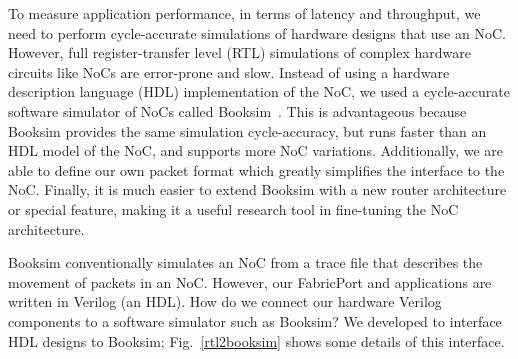

To measure application performance, in terms of latency and throughput, we need to perform cycle-accurate simulations of hardware designs that use an NoC.
However, full register-transfer level (RTL) simulations of complex hardware circuits like NoCs are error-prone and slow.
Instead of using a hardware description language (HDL) implementation of the NoC, we used a cycle-accurate software simulator of NoCs called Booksim~\cite{booksim}.
This is advantageous because Booksim provides the same simulation cycle-accuracy, but runs faster than an HDL model of the NoC, and supports more NoC variations.
Additionally, we are able to define our own packet format which greatly simplifies the interface to the NoC.
Finally, it is much easier to extend Booksim with a new router architecture or special feature, making it a useful research tool in fine-tuning the NoC architecture.

%
%

Booksim conventionally simulates an NoC from a trace file that describes the movement of packets in an NoC.
However, our FabricPort and applications are written in Verilog (an HDL).
How do we connect our hardware Verilog components to a software simulator such as Booksim?
We developed \rtlbook{ } to interface HDL designs to Booksim; Fig.~\ref{rtl2booksim} shows some details of this interface.

